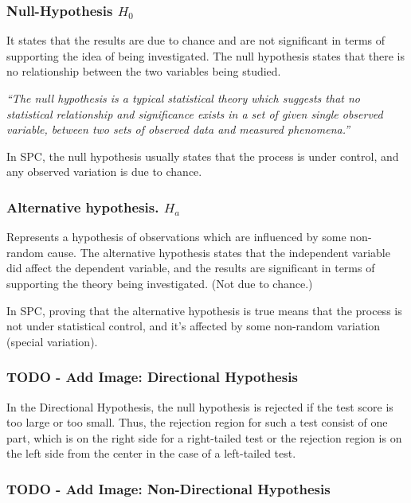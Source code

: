 \documentclass[11pt]{article}
\begin{document}
\hypertarget{null-hypothesis-h_0}{%
\subsubsection{Null-Hypothesis \(H_0\)}\label{null-hypothesis-h_0}}

It states that the results are due to chance and are not significant in
terms of supporting the idea of being investigated. The null hypothesis
states that there is no relationship between the two variables being
studied.

\emph{``The null hypothesis is a typical statistical theory which
suggests that no statistical relationship and significance exists in a
set of given single observed variable, between two sets of observed data
and measured phenomena.''}

In SPC, the null hypothesis usually states that the process is under
control, and any observed variation is due to chance.

\hypertarget{alternative-hypothesis.-h_a}{%
\subsubsection{Alternative hypothesis. \(H_a\)}\label{alternative-hypothesis.-h_a}}

Represents a hypothesis of observations which are influenced by some
non-random cause. The alternative hypothesis states that the independent
variable did affect the dependent variable, and the results are
significant in terms of supporting the theory being investigated. (Not
due to chance.)

In SPC, proving that the alternative hypothesis is true means that the
process is not under statistical control, and it's affected by some
non-random variation (special variation).

\hypertarget{directional-hypothesis}{%
\subsubsection{TODO - Add Image: Directional Hypothesis}\label{directional-hypothesis}}

In the Directional Hypothesis, the null hypothesis is rejected if the
test score is too large or too small. Thus, the rejection region for
such a test consist of one part, which is on the right side for a
right-tailed test or the rejection region is on the left side from the
center in the case of a left-tailed test.

\hypertarget{non-directional-hypothesis}{%
\subsubsection{TODO - Add Image: Non-Directional Hypothesis}\label{non-directional-hypothesis}}
\end{document}
